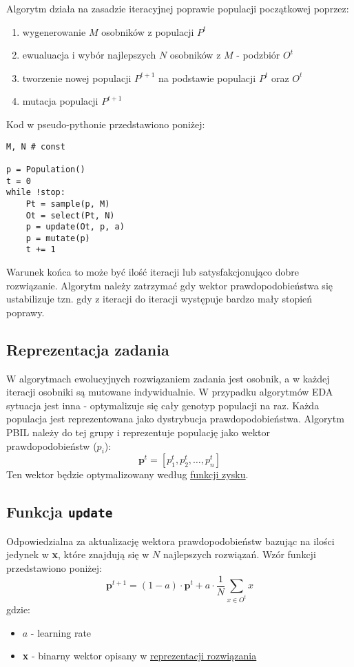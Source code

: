 \documentclass[11pt]{article}
\begin{document}
Algorytm działa na zasadzie iteracyjnej poprawie populacji początkowej poprzez:
\begin{enumerate}
\item wygenerowanie \(M\) osobników z populacji \(P^t\)
\item ewualuacja i wybór najlepszych \(N\) osobników z \(M\) - podzbiór \(O^t\)
\item tworzenie nowej populacji \(P^{t+1}\) na podstawie populacji \(P^t\) oraz \(O^t\)
\item mutacja populacji \(P^{t+1}\)
\end{enumerate}
Kod w pseudo-pythonie przedstawiono poniżej:
\begin{verbatim}
M, N # const

p = Population()
t = 0
while !stop:
    Pt = sample(p, M)
    Ot = select(Pt, N)
    p = update(Ot, p, a)
    p = mutate(p)
    t += 1
\end{verbatim}

Warunek końca to może być ilość iteracji lub satysfakcjonująco dobre rozwiązanie. Algorytm należy zatrzymać gdy wektor prawdopodobieństwa się ustabilizuje tzn. gdy z iteracji do iteracji występuje bardzo mały stopień poprawy.
\subsection{Reprezentacja zadania}
\label{sec:org7e6aa1b}
W algorytmach ewolucyjnych rozwiązaniem zadania jest osobnik, a w każdej iteracji osobniki są mutowane indywidualnie. W przypadku algorytmów EDA sytuacja jest inna - optymalizuje się cały genotyp populacji na raz. Każda populacja jest reprezentowana jako dystrybucja prawdopodobieństwa. Algorytm PBIL należy do tej grupy i reprezentuje populację jako wektor prawdopodobieństw (\(p_i\)):
$$
        \boldsymbol{p}^t = [p_1^t, p_2^t, \dots, p_n^t]
$$
Ten wektor będzie optymalizowany według \uline{\hyperref[sec:orgc54a827]{funkcji zysku}}.
\subsection{Funkcja \texttt{update}}
\label{sec:org5f0c296}
Odpowiedzialna za aktualizację wektora prawdopodobieństw bazując na ilości jedynek w \textbf{x}, które znajdują się w \(N\) najlepszych rozwiązań. Wzór funkcji przedstawiono poniżej:
$$
        \boldsymbol{p}^{t+1}=(1-a) \cdot \boldsymbol{p}^t + a \cdot \frac{1}{N} \sum_{x \in O^t}x
$$
gdzie:
\begin{itemize}
\item \(a\) - learning rate
\item \textbf{x} - binarny wektor opisany w \hyperref[sec:org9d66316]{\uline{reprezentacji rozwiązania}}
\end{itemize}
\end{document}
